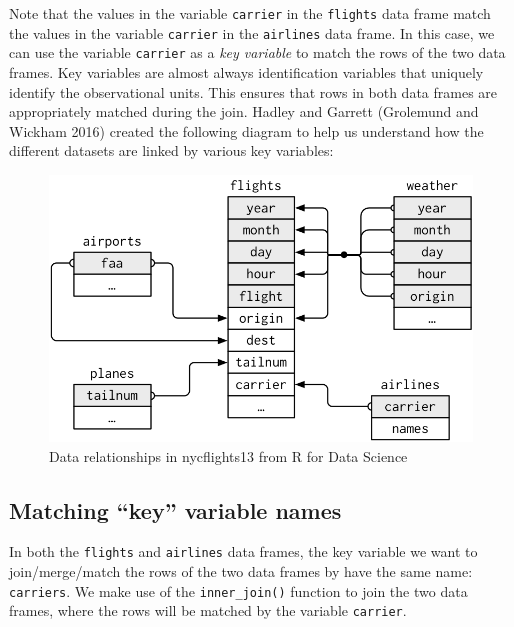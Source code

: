 \documentclass[
  letterpaper,
  DIV=11,
  numbers=noendperiod]{scrreprt}
\theoremstyle{definition}
\theoremstyle{remark}
\begin{document}
Note that the values in the variable \texttt{carrier} in the
\texttt{flights} data frame match the values in the variable
\texttt{carrier} in the \texttt{airlines} data frame. In this case, we
can use the variable \texttt{carrier} as a \emph{key variable} to match
the rows of the two data frames. Key variables are almost always
identification variables that uniquely identify the observational units.
This ensures that rows in both data frames are appropriately matched
during the join. Hadley and Garrett (Grolemund and Wickham 2016) created
the following diagram to help us understand how the different datasets
are linked by various key variables:

\begin{figure}

{\centering \includegraphics{images/relational-nycflights.png}

}

\caption{\label{fig-flights-key-diagram}Data relationships in
nycflights13 from R for Data Science}

\end{figure}

\hypertarget{matching-key-variable-names}{%
\subsection{Matching ``key'' variable
names}\label{matching-key-variable-names}}

In both the \texttt{flights} and \texttt{airlines} data frames, the key
variable we want to join/merge/match the rows of the two data frames by
have the same name: \texttt{carriers}. We make use of the
\texttt{inner\_join()} function to join the two data frames, where the
rows will be matched by the variable \texttt{carrier}.
\end{document}
